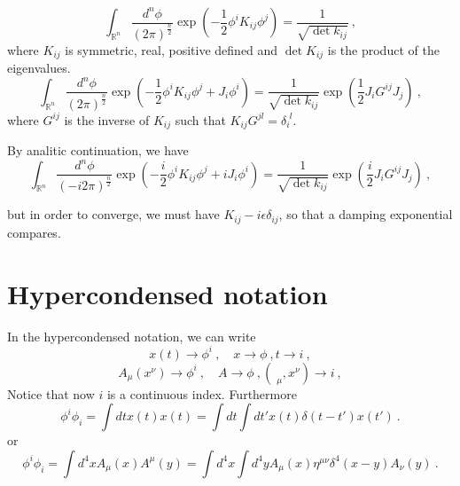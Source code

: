     \begin{equation*}
        \int_{\mathbb R^n} \frac{d^n \phi}{(2\pi)^{\frac{n}{2}}} \exp(- \frac{1}{2} \phi^i K_{ij} \phi^j ) = \frac{1}{\sqrt{\det k_{ij}}} ~,
    \end{equation*}
    where $K_{ij}$ is symmetric, real, positive defined and $\det K_{ij}$ is the product of the eigenvalues.
    \begin{equation*}
        \int_{\mathbb R^n} \frac{d^n \phi}{(2\pi)^{\frac{n}{2}}} \exp(- \frac{1}{2} \phi^i K_{ij} \phi^j + J_i \phi^i) = \frac{1}{\sqrt{\det k_{ij}}} \exp( \frac{1}{2} J_i G^{ij} J_j ) ~,
    \end{equation*}
    where $G^{ij}$ is the inverse of $K_{ij}$ such that $K_{ij}G^{jl} = \delta_i^{\phantom i l}$.

    By analitic continuation, we have 
    \begin{equation*}
        \int_{\mathbb R^n} \frac{d^n \phi}{(-i2\pi)^{\frac{n}{2}}} \exp(- \frac{i}{2} \phi^i K_{ij} \phi^j + i J_i \phi^i) = \frac{1}{\sqrt{\det k_{ij}}} \exp( \frac{i}{2} J_i G^{ij} J_j ) ~,
    \end{equation*}

    but in order to converge, we must have $K_{ij} - i \epsilon \delta_{ij}$, so that a damping exponential compares.

\chapter{Hypercondensed notation}

    In the hypercondensed notation, we can write 
    \begin{equation*}
        x(t) \rightarrow \phi^i ~, \quad x \rightarrow \phi ~, t \rightarrow i ~,
    \end{equation*}
    \begin{equation*}
        A_\mu(x^\nu) \rightarrow \phi^i ~, \quad A \rightarrow \phi ~, (\phantom{|}_\mu, x^\nu) \rightarrow i ~,
    \end{equation*}
    Notice that now $i$ is a continuous index. Furthermore 
    \begin{equation*}
        \phi^i \phi_i = \int dt x(t) x(t) = \int dt \int dt' x(t) \delta (t - t') x(t') ~.
    \end{equation*}
    or
    \begin{equation*}
        \phi^i \phi_i = \int d^4 x A_\mu (x ) A^\mu (y) = \int d^4 x \int d^4 y A_\mu (x) \eta^{\mu\nu} \delta^4 (x-y) A_\nu (y) ~.
    \end{equation*}

